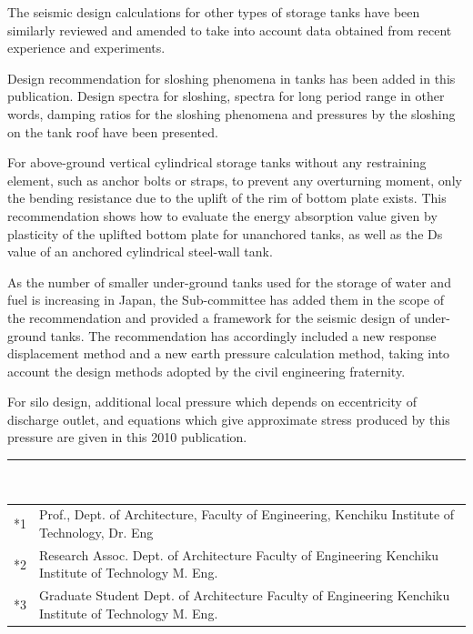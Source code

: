 \documentclass[base=10pt,magstyle=real,a4paper,twocolumn,xelatex,pandoc,jafont=ms]{bxjsarticle}
\begin{document}
The seismic design calculations for other types of storage tanks have been similarly reviewed and amended to take into account data obtained from recent experience and experiments.

Design recommendation for sloshing phenomena in tanks has been added in this publication. Design spectra for sloshing, spectra for long period range in other words, damping ratios for the sloshing phenomena and pressures by the sloshing on the tank roof have been presented.

For above-ground vertical cylindrical storage tanks without any restraining element, such as anchor bolts or straps, to prevent any overturning moment, only the bending resistance due to the uplift of the rim of bottom plate exists. This recommendation shows how to evaluate the energy absorption value given by plasticity of the uplifted bottom plate for unanchored tanks, as well as the Ds value of an anchored cylindrical steel-wall tank.

As the number of smaller under-ground tanks used for the storage of water and fuel is increasing in Japan, the Sub-committee has added them in the scope of the recommendation and provided a framework for the seismic design of under-ground tanks. The recommendation has accordingly included a new response displacement method and a new earth pressure calculation method, taking into account the design methods adopted by the civil engineering fraternity.

For silo design, additional local pressure which depends on eccentricity of discharge outlet, and equations which give approximate stress produced by this pressure are given in this 2010 publication.

\par
\egroup

\noindent \rule[0.5em]{\columnwidth}{0.5truept}\\
{\footnotesize
	\begin{tabular}{rl}
		\mbox{*1}&Prof., Dept. of Architecture, Faculty of Engineering, Kenchiku Institute of Technology, Dr. Eng\\
		\mbox{*2}&Research Assoc. Dept. of Architecture Faculty of Engineering Kenchiku Institute of Technology M. Eng.\\
		\mbox{*3}&Graduate Student Dept. of Architecture Faculty of Engineering Kenchiku Institute of Technology M. Eng.
	\end{tabular}
}
\end{document}
